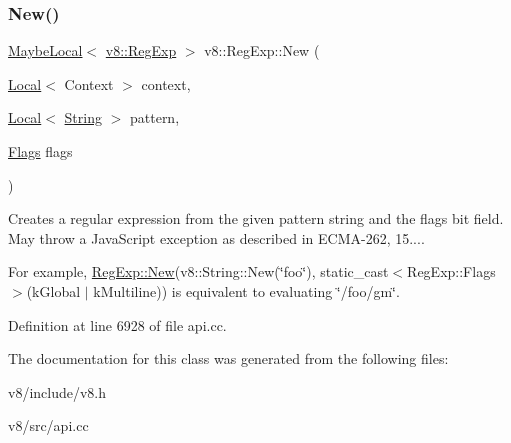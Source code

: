 \subsubsection{\texorpdfstring{New()}{New()}}
{\footnotesize\ttfamily \mbox{\hyperlink{classv8_1_1MaybeLocal}{Maybe\+Local}}$<$ \mbox{\hyperlink{classv8_1_1RegExp}{v8\+::\+Reg\+Exp}} $>$ v8\+::\+Reg\+Exp\+::\+New (\begin{DoxyParamCaption}\item[{\mbox{\hyperlink{classv8_1_1Local}{Local}}$<$ Context $>$}]{context,  }\item[{\mbox{\hyperlink{classv8_1_1Local}{Local}}$<$ \mbox{\hyperlink{classv8_1_1String}{String}} $>$}]{pattern,  }\item[{\mbox{\hyperlink{classv8_1_1RegExp_aa4718a5c1f18472aff3bf51ed694fc5a}{Flags}}}]{flags }\end{DoxyParamCaption})\hspace{0.3cm}{\ttfamily [static]}}

Creates a regular expression from the given pattern string and the flags bit field. May throw a Java\+Script exception as described in E\+C\+M\+A-\/262, 15....

For example, \mbox{\hyperlink{classv8_1_1RegExp_a70ef0ef612099975b84304236736135e}{Reg\+Exp\+::\+New}}(v8\+::\+String\+::\+New(\char`\"{}foo\char`\"{}), static\+\_\+cast$<$\+Reg\+Exp\+::\+Flags$>$(k\+Global $\vert$ k\+Multiline)) is equivalent to evaluating \char`\"{}/foo/gm\char`\"{}. 

Definition at line 6928 of file api.\+cc.



The documentation for this class was generated from the following files\+:\begin{DoxyCompactItemize}
\item 
v8/include/v8.\+h\item 
v8/src/api.\+cc\end{DoxyCompactItemize}
